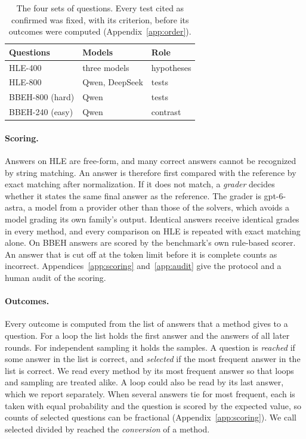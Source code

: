 \documentclass[11pt]{article}
\newcommand{\ds}{DeepSeek}
\newcommand{\qw}{Qwen}
\begin{document}
\begin{table}[t]
\centering
\small
\setlength{\tabcolsep}{3pt}
\begin{tabular}{@{}l l l@{}}
\toprule
Questions & Models & Role \\
\midrule
HLE-400 & three models & hypotheses \\
HLE-800 & \qw, \ds & tests \\
BBEH-800 (hard) & \qw & tests \\
BBEH-240 (easy) & \qw & contrast \\
\bottomrule
\end{tabular}
\caption{The four sets of questions. Every test cited as confirmed was fixed, with its criterion, before its outcomes were computed (Appendix~\ref{app:order}).}
\label{tab:studies}
\end{table}

\paragraph{Scoring.}
Answers on HLE are free-form, and many correct answers cannot be recognized by string matching.
An answer is therefore first compared with the reference by exact matching after normalization. If it does not match, a \emph{grader} decides whether it states the same final answer as the reference.
The grader is gpt-6-astra, a model from a provider other than those of the solvers, which avoids a model grading its own family's output.
Identical answers receive identical grades in every method, and every comparison on HLE is repeated with exact matching alone.
On BBEH answers are scored by the benchmark's own rule-based scorer.
An answer that is cut off at the token limit before it is complete counts as incorrect.
Appendices~\ref{app:scoring} and~\ref{app:audit} give the protocol and a human audit of the scoring.

\paragraph{Outcomes.}
Every outcome is computed from the list of answers that a method gives to a question.
For a loop the list holds the first answer and the answers of all later rounds. For independent sampling it holds the samples.
A question is \emph{reached} if some answer in the list is correct, and \emph{selected} if the most frequent answer in the list is correct.
We read every method by its most frequent answer so that loops and sampling are treated alike. A loop could also be read by its last answer, which we report separately.
When several answers tie for most frequent, each is taken with equal probability and the question is scored by the expected value, so counts of selected questions can be fractional (Appendix~\ref{app:scoring}).
We call selected divided by reached the \emph{conversion} of a method.
\end{document}
